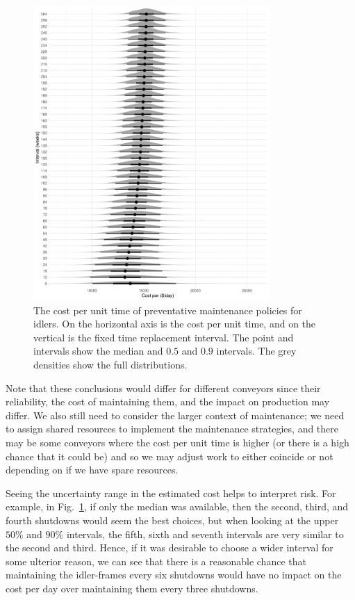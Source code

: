 \begin{figure}
  \centering
  \includegraphics[width=0.8\textwidth]{./figures/ch-3/cost-funciton.pdf}
  \caption{The cost per unit time of preventative maintenance policies for idlers. On the horizontal axis is the cost per unit time, and on the vertical is the fixed time replacement interval. The point and intervals show the median and $0.5$ and $0.9$ intervals. The grey densities show the full distributions.}
  \label{fig:preventative-repl-decision}
\end{figure}

Note that these conclusions would differ for different conveyors since their reliability, the cost of maintaining them, and the impact on production may differ. We also still need to consider the larger context of maintenance; we need to assign shared resources to implement the maintenance strategies, and there may be some conveyors where the cost per unit time is higher (or there is a high chance that it could be) and so we may adjust work to either 
coincide or not depending on if we have spare resources.



Seeing the uncertainty range in the estimated cost helps to interpret risk. For example, in Fig.~\ref{fig:preventative-repl-decision}, if only the median was available, then the second, third, and fourth shutdowns would seem the best choices, but when looking at the upper $50\%$ and $90\%$ intervals, the fifth, sixth and seventh intervals are very similar to the second and third. Hence, if it was desirable to choose a wider interval for some ulterior reason, we can see that there is a reasonable chance that maintaining the idler-frames every six shutdowns would have no impact on the cost per day over maintaining them every three shutdowns.

